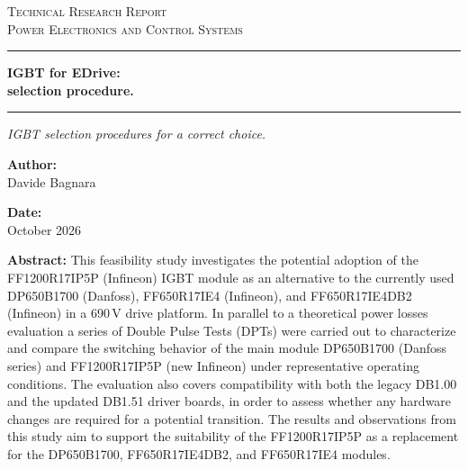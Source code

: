 \documentclass[12pt,a4paper]{scrartcl}
\newcommand{\DocCategory}{Technical Research Report}
\newcommand{\DocField}{Power Electronics and Control Systems}
\newcommand{\DocTitle}{%
	{\fontsize{24}{24}\selectfont\bfseries IGBT for EDrive:} \\[16pt]
	{\fontsize{16}{20}\selectfont\bfseries selection procedure.}
}
\newcommand{\DocSubtitle}{%
	IGBT selection procedures for a correct choice.
}
\newcommand{\DocAuthor}{Davide Bagnara}
\newcommand{\DocDate}{October 2026}
\newcommand{\DocAbstract}{%
This feasibility study investigates the potential adoption of the FF1200R17IP5P (Infineon) IGBT module as an alternative to the currently used DP650B1700 (Danfoss), FF650R17IE4 (Infineon), and FF650R17IE4DB2 (Infineon) in a 690\,V drive platform. In parallel to a theoretical power losses evaluation a series of Double Pulse Tests (DPTs) were carried out to characterize and compare the switching behavior of the main module DP650B1700 (Danfoss series)  and FF1200R17IP5P (new Infineon) under representative operating conditions. The evaluation also covers compatibility with both the legacy DB1.00 and the updated DB1.51 driver boards, in order to assess whether any hardware changes are required for a potential transition. The results and observations from this study aim to support the suitability of the FF1200R17IP5P as a replacement for the DP650B1700, FF650R17IE4DB2, and FF650R17IE4 modules.
}
\begin{document}
	\titlepage
	\begin{center}
		{\Large\scshape \DocCategory}\\[8pt]
		{\large\scshape \DocField}
	\end{center}
	
	\vspace{36pt}
	\noindent\rule{\linewidth}{0.8pt}
	
	\vspace{16pt}
	\begin{center}
		\DocTitle
	\end{center}
	
	\vspace{4pt}
	\noindent\rule{\linewidth}{2.2pt}
	
	\begin{center}
		\begin{onehalfspace}
			{\large\itshape \DocSubtitle}
		\end{onehalfspace}
	\end{center}
	
	\vspace{18pt}
	
	\begin{minipage}{0.92\linewidth}
		\noindent
		\begin{minipage}[t]{0.48\linewidth}
			\textbf{Author:}\\[2pt]
			\DocAuthor
		\end{minipage}%
		\hfill
		\begin{minipage}[t]{0.48\linewidth}
			\raggedleft
			\textbf{Date:}\\[2pt]
			\DocDate
		\end{minipage}
	\end{minipage}
	\vspace{36pt}
	
	\begin{center}
		\begin{minipage}{0.85\linewidth}
			\footnotesize 
			\begin{onehalfspace}
				\textbf{Abstract:} \DocAbstract
			\end{onehalfspace}
		\end{minipage}
	\end{center}
	
\end{document}
